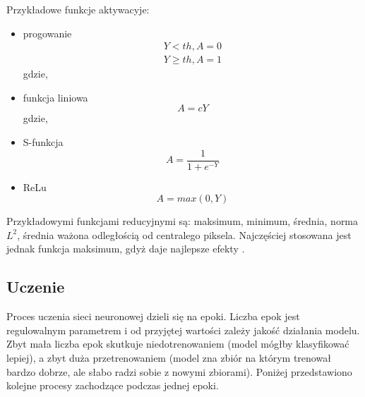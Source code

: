 Przykładowe funkcje aktywacyje:
\begin{itemize}
\item progowanie
\begin{equation}
\begin{aligned}
Y < th, A = 0\\
Y \geq th, A = 1
\end{aligned}
\end{equation}
gdzie,
\item funkcja liniowa
\begin{equation}
A = cY
\end{equation}
gdzie,
\item S-funkcja
\begin{equation}
A = \frac{1}{1+e^{-Y}}
\end{equation}
\item ReLu
\begin{equation}
A = max(0,Y)
\end{equation}
\end{itemize}

Przykładowymi funkcjami reducyjnymi są: maksimum, minimum, średnia, norma \begin{math}L^{2}\end{math}, średnia ważona odległością od centralego piksela. Najczęściej stosowana jest jednak funkcja maksimum, gdyż daje najlepsze efekty \cite{Scherer2010EvaluationOP}.

\subsection{Uczenie}
Proces uczenia sieci neuronowej dzieli się na epoki. Liczba epok jest regulowalnym parametrem i od przyjętej wartości zależy jakość działania modelu. Zbyt mała liczba epok skutkuje niedotrenowaniem (model mógłby klasyfikować lepiej), a zbyt duża przetrenowaniem (model zna zbiór na którym trenował bardzo dobrze, ale słabo radzi sobie z nowymi zbiorami). Poniżej przedstawiono kolejne procesy zachodzące podczas jednej epoki.

